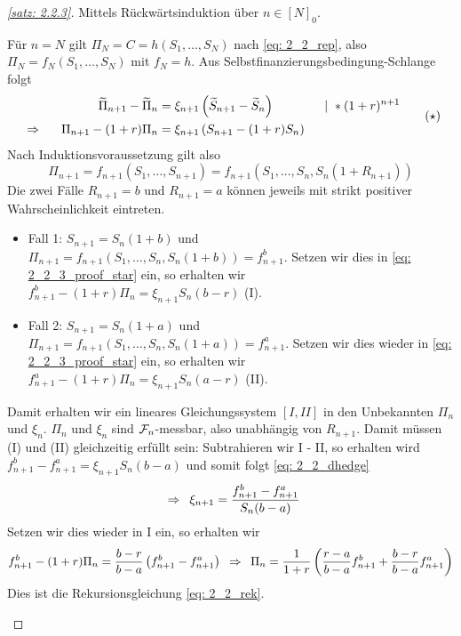 \begin{proof}[\cref{satz: 2.2.3}]
	Mittels Rückwärtsinduktion über $n \in [N]_0$.
	\begin{induction}
		\ianfang Für $n = N$ gilt $\Pi_N = C = h(S_1, \dots, S_N)$ nach \eqref{eq: 2_2_rep}, also $\Pi_N = f_N(S_1, \dots, S_N)$ mit $f_N = h$.
		\ischritt Aus Selbstfinanzierungsbedingung-Schlange folgt %
		\begin{equation*}
			\begin{aligned}
				\widetilde{\Pi}_{n+1} - \widetilde{\Pi}_n &= \xi_{n+1} \left( \widetilde{S}_{n+1} - \widetilde{S}_n \right) \qquad\qquad | \ * (1+r)^{n+1} \\
				\enskip \Rightarrow \enskip  \quad \Pi_{n+1} - (1+r) \Pi_n &= \xi_{n+1} \left( S_{n+1} - (1+r) S_n \right)
			\end{aligned} \tag{$\star$} \label{eq: 2_2_3_proof_star}
		\end{equation*}
		Nach Induktionsvoraussetzung gilt also
		\begin{equation*}
			\Pi_{n+1} = f_{n+1} (S_1, \dots, S_{n+1}) = f_{n+1} (S_1, \dots, S_n, S_n (1+R_{n+1}))
		\end{equation*}
		Die zwei Fälle $R_{n+1} = b$ und $R_{n+1} = a$ können jeweils mit strikt positiver Wahrscheinlichkeit eintreten.
		\begin{itemize}
			\item Fall 1: $S_{n+1} = S_n (1+b)$ und $\Pi_{n+1} = f_{n+1}(S_1, \dots, S_n, S_n(1+b)) = f_{n+1}^b$. Setzen wir dies in \eqref{eq: 2_2_3_proof_star} ein, so erhalten wir $f_{n+1}^b - (1+r) \Pi_n = \xi_{n+1} S_n (b-r)$ (I).
			\item Fall 2: $S_{n+1} = S_n (1+a)$ und $\Pi_{n+1} = f_{n+1}(S_1, \dots, S_n, S_n(1+a)) = f_{n+1}^a$. Setzen wir dies wieder in \eqref{eq: 2_2_3_proof_star} ein, so erhalten wir $f_{n+1}^a - (1+r) \Pi_n = \xi_{n+1} S_n (a-r)$ (II).
		\end{itemize}
	Damit erhalten wir ein lineares Gleichungssystem $[I, II]$ in den Unbekannten $\Pi_n$ und $\xi_n$. 
	$\Pi_n$ und $\xi_n$ sind $\mathcal{F}_n$-messbar, also unabhängig von $R_{n+1}$. Damit müssen (I) und (II) gleichzeitig erfüllt sein: Subtrahieren wir I - II, so erhalten wird $f_{n+1}^b - f_{n+1}^a = \xi_{n+1} S_n (b-a)$ und somit folgt \eqref{eq: 2_2_dhedge}
	\begin{equation*}
		\enskip \Rightarrow \enskip \xi_{n+1} = \frac{f_{n+1}^b - f_{n+1}^a}{S_n (b-a)}
	\end{equation*}
	Setzen wir dies wieder in I ein, so erhalten wir
	\begin{equation*}
		f_{n+1}^b - (1+r) \Pi_n = \frac{b-r}{b-a} \left( f_{n+1}^b - f_{n+1}^a \right) \enskip \Rightarrow \enskip \Pi_n = \frac{1}{1+r} \left( \frac{r-a}{b-a} f_{n+1}^b + \frac{b-r}{b-a} f_{n+1}^a \right)
	\end{equation*}
	Dies ist die Rekursionsgleichung \eqref{eq: 2_2_rek}.
	\end{induction}
\end{proof}

